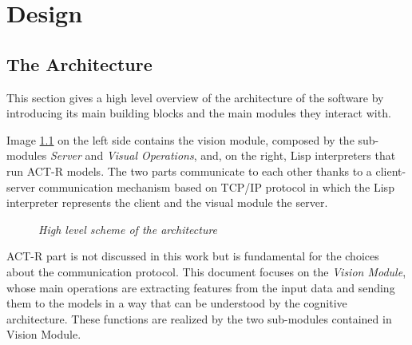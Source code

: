 \chapter{Design}\label{chDesign}
	
	\section{The Architecture}
	This section gives a high level overview of the architecture of the software by introducing its main building blocks and the main modules they interact with. 
  
	Image \ref{fig:architecture} on the left side contains the vision module, composed by the sub-modules \emph{Server} and \emph{Visual Operations}, and, on the right, \mbox{Lisp} interpreters that run \mbox{ACT-R} models.
	The two parts communicate to each other thanks to a \mbox{client-server} communication mechanism based on \mbox{TCP/IP} protocol in which the \mbox{Lisp} interpreter represents the client and the visual module the server.
	
	\begin{figure}[h]
	  \begin{center} 
	  \end{center} 
	  \caption{\textit{High level scheme of the architecture}}  
	  \label{fig:architecture}
 	\end{figure}


	\mbox{ACT-R} part is not discussed in this work but is fundamental for the choices about the communication protocol.
	This document focuses on the \emph{Vision Module}, whose main operations are extracting features from the input data and sending them to the models in a way that can be understood by the cognitive architecture. 
	These functions are realized by the two sub-modules contained in Vision Module.

